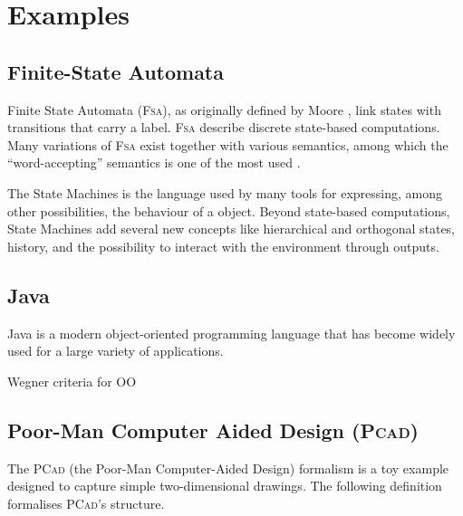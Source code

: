 \section{Examples}
\label{sec:Examples}

\subsection{Finite-State Automata}
\label{sec:FSM}

Finite State Automata (\textsc{Fsa}), as originally defined by Moore 
\cite{J:Moore:1956}, link states with transitions that carry a label. 
\textsc{Fsa} describe discrete state-based computations. Many variations of 
\textsc{Fsa} exist together with various semantics, among which the 
``word-accepting'' semantics is one of the most used \cite{}. 

The \UML State Machines \cite{TR:UML-2.5:2015} is the language used by many 
tools for expressing, among other possibilities, the behaviour of a \UML 
object. Beyond state-based computations, \UML State Machines add several new 
concepts like hierarchical and orthogonal states, history, and the possibility 
to interact with the environment through outputs.

\subsection{Java}
\label{sec:Java}

Java \cite{B:Java:2019} is a modern object-oriented programming language that 
has become widely used for a large variety of applications. 

Wegner criteria for OO \cite{Wegner:1987}

\subsection{Poor-Man Computer Aided Design (\textsc{Pcad)}}
\label{sec:PCAD}

The \textsc{PCad} (the Poor-Man Computer-Aided Design) formalism is a toy 
example designed to capture simple two-dimensional drawings. The following 
definition formalises \textsc{PCad}'s structure.

